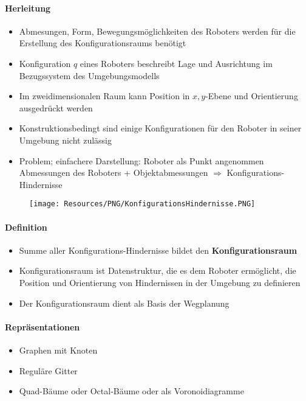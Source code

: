 \paragraph{Herleitung}
\begin{itemize}
	\item Abmesungen, Form, Bewegungsmöglichkeiten des Roboters werden für die Erstellung des Konfigurationsraums benötigt
	\item Konfiguration $q$ eines Roboters beschreibt Lage und Ausrichtung im Bezugssystem des Umgebungsmodells
	\item Im zweidimensionalen Raum kann Position in $x,y$-Ebene und Orientierung ausgedrückt werden
	\item Konstruktionsbedingt sind einige Konfigurationen für den Roboter in seiner Umgebung nicht zulässig
	\item Problem; einfachere Darstellung:
	\subitem Roboter als Punkt angenommen
	\subitem Abmessungen des Roboters + Objektabmessungen $\Rightarrow$ Konfigurations-Hindernisse
\end{itemize}
\begin{figure}[H]
	\begin{center}
		\texttt{[image: Resources/PNG/KonfigurationsHindernisse.PNG]}
		\caption{}
		\label{fig:PNG/KonfigurationsHindernisse.PNG}
	\end{center}
\end{figure}
\paragraph{Definition}
\begin{itemize}
	\item Summe aller Konfigurations-Hindernisse bildet den \textbf{Konfigurationsraum}
	\item Konfigurationsraum ist Datenstruktur, die es dem Roboter ermöglicht, die Position und Orientierung von Hindernissen in der Umgebung zu definieren
	\item Der Konfigurationsraum dient als Basis der Wegplanung
\end{itemize}
\paragraph{Repräsentationen}
\begin{itemize}
	\item Graphen mit Knoten
	\item Reguläre Gitter
	\item Quad-Bäume oder Octal-Bäume oder als Voronoidiagramme
\end{itemize}

